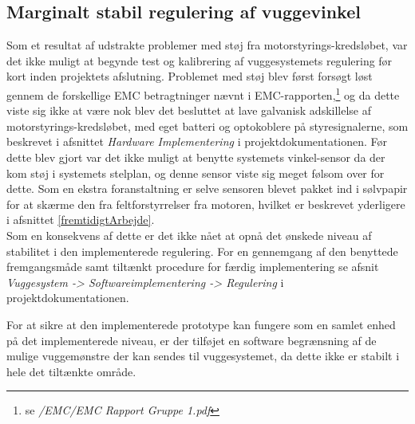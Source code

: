 \subsection{Marginalt stabil regulering af vuggevinkel}
Som et resultat af udstrakte problemer med støj fra motorstyrings-kredsløbet, var det ikke muligt at begynde test og kalibrering af vuggesystemets regulering før kort inden projektets afslutning. Problemet med støj blev først forsøgt løst gennem de forskellige EMC betragtninger nævnt i EMC-rapporten,\footnote{se \citep{cd} \textit{/EMC/EMC Rapport Gruppe 1.pdf}} og da dette viste sig ikke at være nok blev det besluttet at lave galvanisk adskillelse af motorstyrings-kredsløbet, med eget batteri og optokoblere på styresignalerne, som beskrevet i afsnittet \textit{Hardware Implementering} i projektdokumentationen. Før dette blev gjort var det ikke muligt at benytte systemets vinkel-sensor da der kom støj i systemets stelplan, og denne sensor viste sig meget følsom over for dette. Som en ekstra foranstaltning er selve sensoren blevet pakket ind i sølvpapir for at skærme den fra feltforstyrrelser fra motoren, hvilket er beskrevet yderligere i afsnittet \vref{fremtidigtArbejde}.\\
Som en konsekvens af dette er det ikke nået at opnå det ønskede niveau af stabilitet i den implementerede regulering. For en gennemgang af den benyttede fremgangsmåde samt tiltænkt procedure for færdig implementering se afsnit \textit{Vuggesystem -> Softwareimplementering -> Regulering} i projektdokumentationen. 

For at sikre at den implementerede prototype kan fungere som en samlet enhed på det implementerede niveau, er der tilføjet en software begrænsning af de mulige vuggemønstre der kan sendes til vuggesystemet, da dette ikke er stabilt i hele det tiltænkte område.